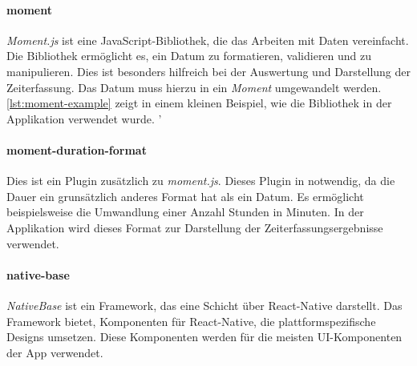 \paragraph{moment}
\textit{Moment.js} ist eine JavaScript-Bibliothek, die das Arbeiten mit Daten vereinfacht. Die Bibliothek ermöglicht es,
ein Datum zu formatieren, validieren und zu manipulieren. Dies ist besonders hilfreich bei der Auswertung und Darstellung der
Zeiterfassung. Das Datum muss hierzu in ein \textit{Moment} umgewandelt werden. \autoref{lst:moment-example} zeigt in einem kleinen Beispiel,
wie die Bibliothek in der Applikation verwendet wurde.\cite{MomentJS:online}
'

\paragraph{moment-duration-format}
Dies ist ein Plugin zusätzlich zu \textit{moment.js}. Dieses Plugin in notwendig, da die Dauer ein
grunsätzlich anderes Format hat als ein Datum. Es ermöglicht beispielsweise die Umwandlung einer Anzahl Stunden in Minuten.
In der Applikation wird dieses Format zur Darstellung der Zeiterfassungsergebnisse verwendet. \cite{MomentDuration:online}

\paragraph{native-base}
\textit{NativeBase} ist ein Framework, das eine Schicht über React-Native darstellt. Das Framework bietet,
Komponenten für React-Native, die plattformspezifische Designs umsetzen. Diese Komponenten werden für die meisten UI-Komponenten der App
verwendet. \cite{NativeBase:online}